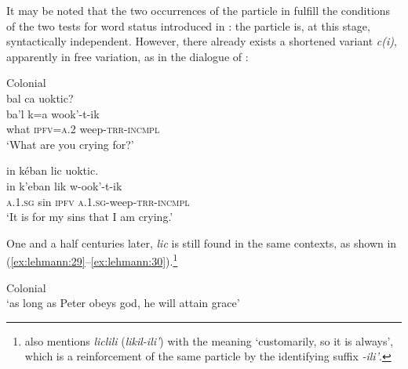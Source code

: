 \documentclass[output=paper]{langsci/langscibook}
\begin{document}
It may be noted that the two occurrences of the particle in  fulfill the conditions of the two tests for word status introduced in : the particle is, at this stage, syntactically independent. However, there already exists a shortened variant \textit{c(i)}, apparently in free variation, as in the dialogue of :


\ea\label{ex:lehmann:28}
Colonial  \\
\ea bal    ca        uoktic?\\
\gll   ba’l    k=a      wook’-t-ik\\
what    \textsc{ipfv=a.2}  weep-\textsc{trr-incmpl}\\
\glt ‘What are you crying for?’

\ex 
in      kéban    lic    uoktic.\\
\gll   in      k’eban    lik    w-ook’-t-ik\\
\textsc{a.1.sg}  sin      \textsc{ipfv }   \textsc{a.1.sg}{}-weep-\textsc{trr-incmpl}\\
\glt‘It is for my sins that I am crying.’ \citep[67]{Coronel1620}
\z
\z 


One and a half centuries later, \textit{lic} is still found in the same contexts, as shown in (\ref{ex:lehmann:29}–\ref{ex:lehmann:30}).\footnote{\citet[§299, p.140]{Beltrán1746} also mentions \textit{liclili} (\textit{likil-ili’}) with the meaning ‘customarily, so it is always’, which is a reinforcement of the same particle by the identifying suffix \textit{-ili’}.}\largerpage


\ea\label{ex:lehmann:29}
Colonial  \\
\glt ‘as long as Peter obeys god, he will attain grace’ \citep[§261]{Beltrán1746}
\z
\end{document}
